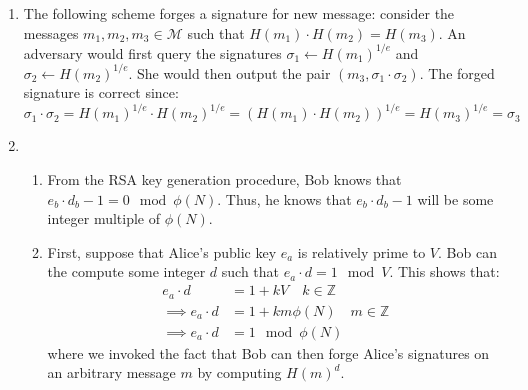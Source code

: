 \documentclass[12pt]{article}%
\newcommand{\M}{\mathcal{M}}
\begin{document}
\begin{enumerate}
\begin{enumerate}
    \end{enumerate}
  \item The following scheme forges a signature for new message: consider the messages $m_1, m_2, m_3 \in \M$ such that $H(m_1)\cdot H(m_2) = H(m_3)$. An adversary would first query the signatures $\sigma_1 \leftarrow H(m_1)^{1/e}$ and $\sigma_2 \leftarrow H(m_2)^{1/e}$. She would then output the pair $(m_3, \sigma_1 \cdot \sigma_2)$. The forged signature is correct since:
  $$ \sigma_1 \cdot \sigma_2 = H(m_1)^{1/e} \cdot H(m_2)^{1/e} = (H(m_1)\cdot H(m_2))^{1/e} = H(m_3)^{1/e} = \sigma_3 $$
  \item
    \begin{enumerate}
      \item From the RSA key generation procedure, Bob knows that $e_b \cdot d_b - 1 = 0  \mod{\phi(N)}$. Thus, he knows that $e_b \cdot d_b - 1$ will be some integer multiple of $\phi(N)$.
      \item First, suppose that Alice's public key $e_a$ is relatively prime to $V$. Bob can the compute some integer $d$ such that $e_a \cdot d = 1 \mod{V}$. This shows that:
      \begin{align*}
        e_a \cdot d & = 1 + kV \quad  k \in \mathbb{Z} \\
        \implies e_a \cdot d & = 1 + km\phi(N) \quad m \in \mathbb{Z} \\
        \implies e_a \cdot d & = 1 \mod{\phi(N)}
      \end{align*}
      where we invoked the fact that
      Bob can then forge Alice's signatures on an arbitrary message $m$ by computing $H(m)^d$.


\end{enumerate}
\end{enumerate}
\end{document}
